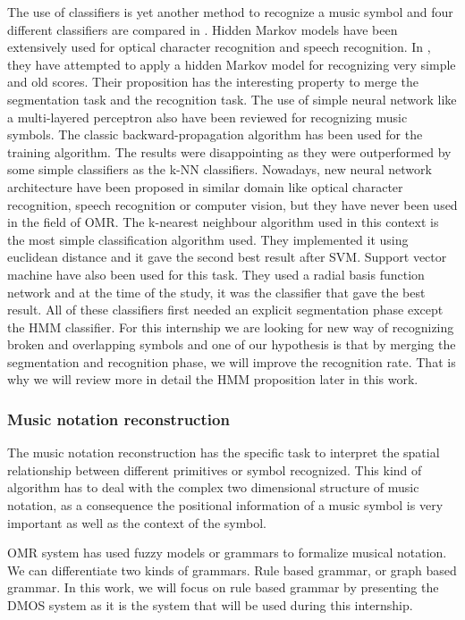 \documentclass[11pt]{sdm}
\begin{document}
The use of classifiers is yet another method to recognize a music symbol and four different classifiers are compared in \cite{rebelo_optical_2009}.
Hidden Markov models have been extensively used for optical character recognition and speech recognition.
In \cite{pugin_optical_2006}, they have attempted to apply a hidden Markov model for recognizing very simple and old scores.
Their proposition has the interesting property to merge the segmentation task and the recognition task.
The use of simple neural network like a multi-layered perceptron also have been reviewed for recognizing music symbols.
The classic backward-propagation algorithm has been used for the training algorithm.
The results were disappointing as they were outperformed by some simple classifiers as the k-NN classifiers.
Nowadays, new neural network architecture have been proposed in similar domain like optical character recognition, speech recognition or computer vision, but they have never been used in the field of OMR.
The k-nearest neighbour algorithm used in this context is the most simple classification algorithm used.
They implemented it using euclidean distance and it gave the second best result after SVM.
Support vector machine have also been used for this task.
They used a radial basis function network and at the time of the study, it was the classifier that gave the best result.
All of these classifiers first needed an explicit segmentation phase except the HMM classifier.
For this internship we are looking for new way of recognizing broken and overlapping symbols and one of our hypothesis is that by merging the segmentation and recognition phase, we will improve the recognition rate.
That is why we will review more in detail the HMM proposition later in this work.

\subsubsection{Music notation reconstruction}

The music notation reconstruction has the specific task to interpret the spatial relationship between different primitives or symbol recognized.
This kind of algorithm has to deal with the complex two dimensional structure of music notation, as a consequence the positional information of a music symbol is very important as well as the context of the symbol.

OMR system has used fuzzy models or grammars to formalize musical notation.
We can differentiate two kinds of grammars.
Rule based grammar, or graph based grammar.
In this work, we will focus on rule based grammar by presenting the DMOS system \cite{couasnon_dmos_2001} as it is the system that will be used during this internship.
\end{document}
